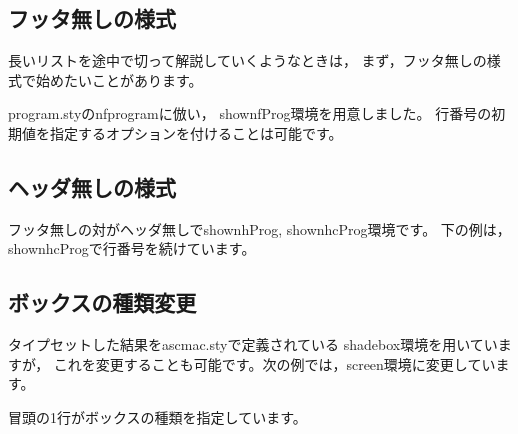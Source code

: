 \documentclass{jarticle}
\begin{document}
\clearpage

\subsection{フッタ無しの様式}
長いリストを途中で切って解説していくようなときは，
まず，フッタ無しの様式で始めたいことがあります。

\textsf{program.sty}の\textsf{nfprogram}に倣い，
\textsf{shownfProg}環境を用意しました。
行番号の初期値を指定するオプションを付けることは可能です。

\clearpage

\subsection{ヘッダ無しの様式}
フッタ無しの対がヘッダ無しで\textsf{shownhProg}, \textsf{shownhcProg}環境です。
下の例は，\textsf{shownhcProg}で行番号を続けています。

\clearpage

\subsection{ボックスの種類変更}
タイプセットした結果を\textsf{ascmac.sty}で定義されている
\textsf{shadebox}環境を用いていますが，
これを変更することも可能です。次の例では，\textsf{screen}環境に変更しています。


冒頭の1行がボックスの種類を指定しています。
\end{document}
